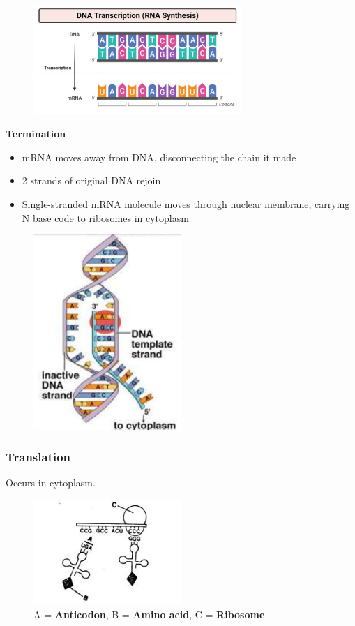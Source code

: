 \documentclass[a4paper,12pt]{article}
\begin{document}
\begin{figure}[H]
    \centering
    \includegraphics[width=0.7\textwidth]{transcription2}
\end{figure}

\textbf{Termination}
\begin{itemize}
    \item{mRNA moves away from DNA, disconnecting the chain it made}
    \item{2 strands of original DNA rejoin}
    \item{Single-stranded mRNA molecule moves through nuclear membrane, carrying N base code to ribosomes in cytoplasm}
\end{itemize}

\begin{figure}[H]
    \centering
    \includegraphics[width=0.50\textwidth]{transcription}
\end{figure}

\subsubsection{Translation}
Occurs in cytoplasm.

\begin{figure}[H]
    \centering
    \includegraphics[width=0.50\textwidth]{translation}
    \caption{A = \textbf{Anticodon}, B = \textbf{Amino acid}, C = \textbf{Ribosome}}
\end{figure}
\end{document}
